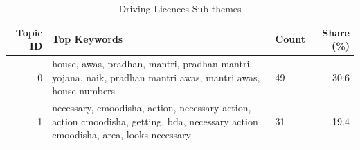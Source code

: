 \begin{table}[htbp]
\centering
\caption{Driving Licences Sub-themes}
\label{tab:topics_Driving_Licences}
\begin{tabular}{rlp{7cm}r}
\toprule
Topic ID & Top Keywords & Count & Share (\%) \\
\midrule
0 & house, awas, pradhan, mantri, pradhan mantri, yojana, naik, pradhan mantri awas, mantri awas, house numbers & 49 & 30.6 \\
1 & necessary, cmoodisha, action, necessary action, action cmoodisha, getting, bda, necessary action cmoodisha, area, looks necessary & 31 & 19.4 \\
\bottomrule
\end{tabular}
\end{table}